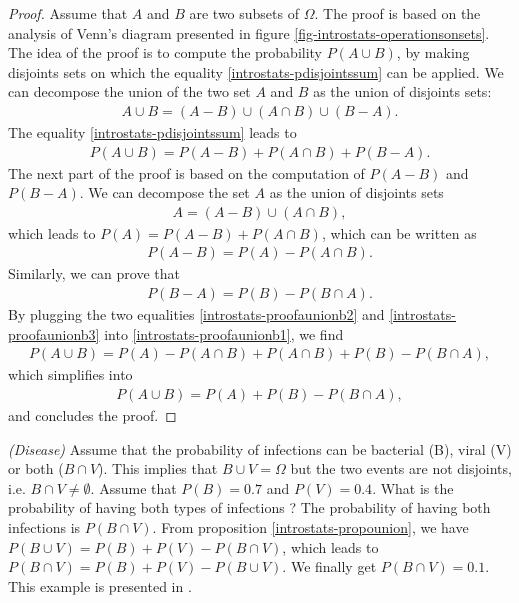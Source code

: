 \begin{proof}
Assume that $A$ and $B$ are two subsets of $\Omega$.
The proof is based on the analysis of Venn's diagram presented in
figure \ref{fig-introstats-operationsonsets}. The idea of the 
proof is to compute the probability $P(A\cup B)$, by making disjoints sets on which the 
equality \ref{introstats-pdisjointssum} can be applied.
We can decompose the union of the two set $A$ and $B$ as the 
union of disjoints sets:
\begin{eqnarray}
A\cup B = (A-B)\cup(A\cap B)\cup(B-A).
\end{eqnarray}
The equality \ref{introstats-pdisjointssum} leads to 
\begin{eqnarray}
\label{introstats-proofaunionb1}
P(A\cup B) = P(A-B) + P(A\cap B) + P(B-A).
\end{eqnarray}
The next part of the proof is based on the computation of 
$P(A-B)$ and $P(B-A)$.
We can decompose the set $A$ as the union of disjoints 
sets
\begin{eqnarray}
A = (A - B)\cup (A\cap B),
\end{eqnarray}
which leads to $P(A) = P(A - B) + P(A\cap B)$,
which can be written as 
\begin{eqnarray}
\label{introstats-proofaunionb2}
P(A - B) = P(A) - P(A\cap B).
\end{eqnarray}
Similarly, we can prove that 
\begin{eqnarray}
\label{introstats-proofaunionb3}
P(B - A) = P(B) - P(B\cap A).
\end{eqnarray}
By plugging the two equalities \ref{introstats-proofaunionb2}
and \ref{introstats-proofaunionb3} into \ref{introstats-proofaunionb1},
we find 
\begin{eqnarray}
P(A\cup B) = P(A) - P(A\cap B) + P(A\cap B) + P(B) - P(B\cap A),
\end{eqnarray}
which simplifies into
\begin{eqnarray}
P(A\cup B) = P(A) + P(B) - P(B\cap A),
\end{eqnarray}
and concludes the proof.
\end{proof}


\begin{example}
\emph{(Disease)}
\label{introstats-probabactvirus}
Assume that the probability of infections can be bacterial (B), viral (V) or 
both ($B\cap V$). This implies that $B\cup V=\Omega$ but the two events 
are not disjoints, i.e. $B\cap V \neq \emptyset$. Assume that $P(B)=0.7$ and $P(V)=0.4$.
What is the probability of having both types of infections ?
The probability of having both infections is $P(B\cap V)$. 
From proposition \ref{introstats-propounion}, we have $P(B\cup V) = P(B) + P(V) - P(B\cap V)$,
which leads to $P(B\cap V) = P(B) + P(V) - P(B\cup V)$.
We finally get $P(B\cap V) = 0.1$.
This example is presented in \cite{lectureIntroToProbastats}.
\end{example}

